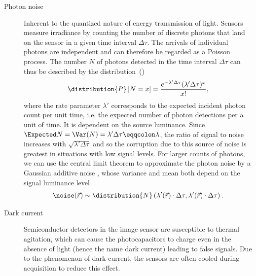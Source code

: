 \begin{description}
    \item[Photon noise]
        Inherent to the quantized nature of energy transmission of light. 
        Sensors measure irradiance by counting the number of discrete photons that land on the sensor in a given time
            interval \(\Delta \tau\). 
        The arrivals of individual photons are independent and can therefore be regarded as a Poisson process.
        The number \(N\) of photons detected in the time interval \(\Delta\tau\) can thus be described by the
            distribution~()
            \begin{equation*}
                \distribution{P}\left[ N = x \right] = \frac{e^{-\lambda'\Delta\tau}(\lambda'\Delta\tau)^x}{x!},
            \end{equation*}
            where the rate parameter \(\lambda'\) corresponds to the expected incident photon count per unit 
            time, i.e. the expected number of photon detections per a unit of time.
        It is dependent on the source luminance.
        Since \(\Expected N = \Var(N) = \lambda'\Delta\tau \eqqcolon \lambda\), the ratio of signal to noise increases 
            with \(\sqrt{\lambda'\Delta\tau}\) and so the corruption due to this source of noise is greatest in 
            situations with low signal levels.
        For larger counts of photons, we can use the central limit theorem to approximate the photon noise by a Gaussian
            additive noise , whose variance and mean both depend on the signal luminance level
            \begin{equation*}
                \noise(\vec{r}) \sim \distribution{N}\left(\lambda'(\vec{r})\cdot\Delta\tau, 
                                                         \lambda'(\vec{r})\cdot\Delta\tau \right).
            \end{equation*}
    \item[Dark current]
        Semiconductor detectors in the image sensor are susceptible to thermal agitation, which can 
            cause the photocapacitors to charge even in the absence of light (hence the name dark current) leading to 
            false signals.
        Due to the phenomenon of dark current, the sensors are often cooled during acquisition to reduce this effect.

\end{description}
